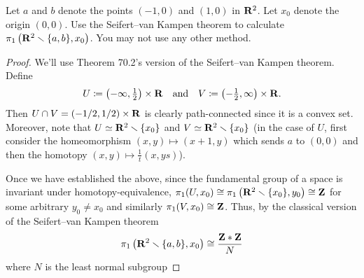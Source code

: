 \begin{problem}
Let $a$ and $b$ denote the points $(-1,0)$ and $(1,0)$ in $\mathbf{R}^2$. Let
$x_0$ denote the origin $(0,0)$. Use the Seifert--van Kampen theorem to
calculate $\pi_1\left(\mathbf{R}^2\smallsetminus\{a,b\},x_0\right)$. You may not use any other
method.
\end{problem}
\begin{proof}
We'll use Theorem 70.2's version of the Seifert--van Kampen theorem. Define
\[
U\coloneqq\left(-\infty,\tfrac{1}{2}\right)\times\mathbf{R}
\quad\text{and}\quad
V\coloneqq\left(-\tfrac{1}{2},\infty\right)\times\mathbf{R}.
\]
Then $U\cap V=(-1/2,1/2)\times\mathbf{R}$ is clearly path-connected since it is a
convex set. Moreover, note that $U\simeq\mathbf{R}^2\smallsetminus\{x_0\}$ and
$V\simeq\mathbf{R}^2\smallsetminus\{x_0\}$ (in the case of $U$, first consider the
homeomorphism $(x,y)\mapsto(x+1,y)$ which sends $a$ to $(0,0)$ and then the
homotopy $(x,y)\mapsto\tfrac{1}{t}(x,ys)$).

Once we have established the above, since the fundamental group of a space
is invariant under homotopy-equivalence,
$\pi_1(U,x_0)\cong\pi_1\left(\mathbf{R}^2\smallsetminus\{x_0\},y_0\right)\cong\mathbf{Z}$ for some
arbitrary $y_0\neq x_0$ and similarly $\pi_1(V,x_0)\cong\mathbf{Z}$. Thus, by the
classical version of the Seifert--van Kampen theorem
\[
\pi_1\left(\mathbf{R}^2\smallsetminus\{a,b\},x_0\right)\cong
\frac{\mathbf{Z}*\mathbf{Z}}{N}
\]
where $N$ is the least normal subgroup
\end{proof}

